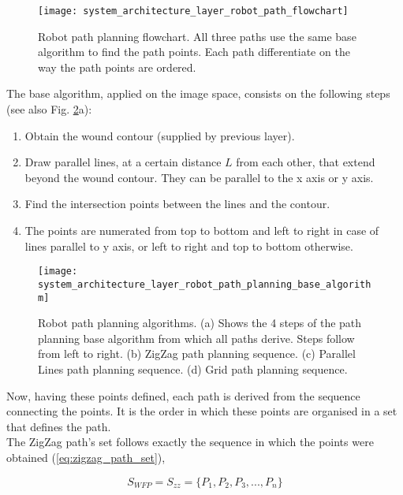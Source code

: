 \begin{figure}[htbp]
	\centering
	\texttt{[image: system\_architecture\_layer\_robot\_path\_flowchart]}
	\caption{Robot path planning flowchart. All three paths use the same base algorithm to find the path points. Each path differentiate on the way the path points are ordered.}
	\label{fig:system_architecture_layer_robot_path_flowchart}
\end{figure}

The base algorithm, applied on the image space, consists on the following steps (see also Fig. \ref{fig:system_architecture_layer_robot_path_planning_base_algorithm}a):

\begin{enumerate}
    \item Obtain the wound contour (supplied by previous layer).
    \item Draw parallel lines, at a certain distance $L$ from each other, that extend beyond the wound contour. They can be parallel to the x axis or y axis.
    \item Find the intersection points between the lines and the contour.
    \item The points are numerated from top to bottom and left to right in case of lines parallel to y axis, or left to right and top to bottom otherwise.
\end{enumerate}

\begin{figure}[htbp]
	\centering
	\texttt{[image: system\_architecture\_layer\_robot\_path\_planning\_base\_algorithm]}
	\caption{Robot path planning algorithms. (a) Shows the 4 steps of the path planning base algorithm from which all paths derive. Steps follow from left to right. (b) ZigZag path planning sequence. (c) Parallel Lines path planning sequence. (d) Grid path planning sequence.}
	\label{fig:system_architecture_layer_robot_path_planning_base_algorithm}
\end{figure}

Now, having these points defined, each path is derived from the sequence connecting the points. It is the order in which these points are organised in a set that defines the path.\\

The ZigZag path's set follows exactly the sequence in which the points were obtained (\ref{eq:zigzag_path_set}),

\begin{equation}
\label{eq:zigzag_path_set}
    S_{WFP} = S_{zz} = \{ P_1, P_2, P_3, ..., P_n \}
\end{equation}

